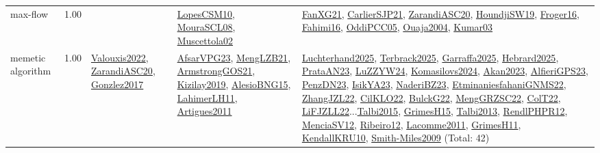 {\begin{longtable}{p{3cm}r>{\raggedright\arraybackslash}p{6cm}>{\raggedright\arraybackslash}p{6cm}>{\raggedright\arraybackslash}p{8cm}}
\index{max-flow}\index{Algorithms!max-flow}max-flow &  1.00 &  & \hyperref[detail:LopesCSM10]{LopesCSM10}, \hyperref[detail:MouraSCL08]{MouraSCL08}, \hyperref[detail:Muscettola02]{Muscettola02} & \hyperref[detail:FanXG21]{FanXG21}, \hyperref[detail:CarlierSJP21]{CarlierSJP21}, \hyperref[detail:ZarandiASC20]{ZarandiASC20}, \hyperref[detail:HoundjiSW19]{HoundjiSW19}, \hyperref[detail:Froger16]{Froger16}, \hyperref[detail:Fahimi16]{Fahimi16}, \hyperref[detail:OddiPCC05]{OddiPCC05}, \hyperref[detail:Ouaja2004]{Ouaja2004}, \hyperref[detail:Kumar03]{Kumar03}\\
\index{memetic algorithm}\index{Algorithms!memetic algorithm}memetic algorithm &  1.00 & \hyperref[detail:Valouxis2022]{Valouxis2022}, \hyperref[detail:ZarandiASC20]{ZarandiASC20}, \hyperref[detail:Gonzlez2017]{Gonzlez2017} & \hyperref[detail:AfsarVPG23]{AfsarVPG23}, \hyperref[detail:MengLZB21]{MengLZB21}, \hyperref[detail:ArmstrongGOS21]{ArmstrongGOS21}, \hyperref[detail:Kizilay2019]{Kizilay2019}, \hyperref[detail:AlesioBNG15]{AlesioBNG15}, \hyperref[detail:LahimerLH11]{LahimerLH11}, \hyperref[detail:Artigues2011]{Artigues2011} & \hyperref[detail:Luchterhand2025]{Luchterhand2025}, \hyperref[detail:Terbrack2025]{Terbrack2025}, \hyperref[detail:Garraffa2025]{Garraffa2025}, \hyperref[detail:Hebrard2025]{Hebrard2025}, \hyperref[detail:PrataAN23]{PrataAN23}, \hyperref[detail:LuZZYW24]{LuZZYW24}, \hyperref[detail:Komasilovs2024]{Komasilovs2024}, \hyperref[detail:Akan2023]{Akan2023}, \hyperref[detail:AlfieriGPS23]{AlfieriGPS23}, \hyperref[detail:PenzDN23]{PenzDN23}, \hyperref[detail:IsikYA23]{IsikYA23}, \hyperref[detail:NaderiBZ23]{NaderiBZ23}, \hyperref[detail:EtminaniesfahaniGNMS22]{EtminaniesfahaniGNMS22}, \hyperref[detail:ZhangJZL22]{ZhangJZL22}, \hyperref[detail:CilKLO22]{CilKLO22}, \hyperref[detail:BulckG22]{BulckG22}, \hyperref[detail:MengGRZSC22]{MengGRZSC22}, \hyperref[detail:ColT22]{ColT22}, \hyperref[detail:LiFJZLL22]{LiFJZLL22}...\hyperref[detail:Talbi2015]{Talbi2015}, \hyperref[detail:GrimesH15]{GrimesH15}, \hyperref[detail:Talbi2013]{Talbi2013}, \hyperref[detail:RendlPHPR12]{RendlPHPR12}, \hyperref[detail:MenciaSV12]{MenciaSV12}, \hyperref[detail:Ribeiro12]{Ribeiro12}, \hyperref[detail:Lacomme2011]{Lacomme2011}, \hyperref[detail:GrimesH11]{GrimesH11}, \hyperref[detail:KendallKRU10]{KendallKRU10}, \hyperref[detail:Smith-Miles2009]{Smith-Miles2009} (Total: 42)\\

\end{longtable}}
